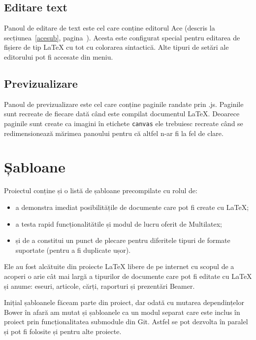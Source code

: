 \documentclass[a4wide,12pt]{report}
\newcommand{\cod}[1]{\texttt{#1}}
\newcommand{\acr}[1]{{\textsmaller[1]{\textsc{#1}}}} %
\begin{document}
\subsection{Editare text}

Panoul de editare de text este cel care conține editorul Ace (descris la
secțiunea~\ref{acesub}, pagina~\pageref{acesub}). Acesta este configurat special
pentru editarea de fișiere de tip \LaTeX{} cu tot cu colorarea sintactică. Alte
tipuri de setări ale editorului pot fi accesate din meniu.

\subsection{Previzualizare}

Panoul de previzualizare este cel care conține paginile randate prin
\acr{PDF}.js. Paginile sunt recreate de fiecare dată când este compilat
documentul \LaTeX{}. Deoarece paginile sunt create ca imagini în etichete
\cod{canvas} ele trebuiesc recreate când se redimensionează mărimea panoului
pentru că altfel n-ar fi la fel de clare.

\section{Șabloane}
\label{sabloanesec}

Proiectul conține și o listă de șabloane precompilate cu rolul de:

\begin{itemize}

\item a demonstra imediat posibilitățile de documente care pot fi create cu
\LaTeX{};

\item a testa rapid funcționalitătile și modul de lucru oferit de Multilatex;

\item și de a constitui un punct de plecare pentru diferitele tipuri de formate
suportate (pentru a fi duplicate ușor).

\end{itemize}

Ele au fost alcătuite din proiecte \LaTeX{} libere de pe internet cu scopul de a
acoperi o arie cât mai largă a tipurilor de documente care pot fi editate cu
\LaTeX{} și anume: eseuri, articole, cărți, raporturi și prezentări Beamer.

Inițial șabloanele făceam parte din proiect, dar odată cu mutarea dependințelor
Bower în afară am mutat și șabloanele ca un modul separat care este inclus în
proiect prin funcționalitatea submodule din Git. Astfel se pot dezvolta în
paralel și pot fi folosite și pentru alte proiecte.
\end{document}
